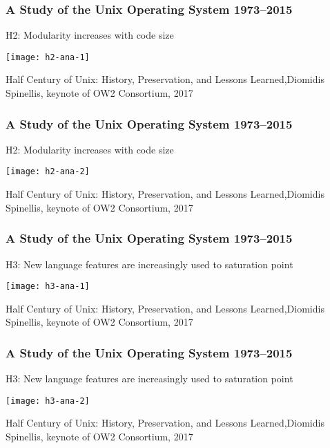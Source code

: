 \begin{frame}[plain]
	\frametitle{A Study of the Unix Operating System 1973–2015}
	\centering
	H2: Modularity increases with code
	size
	
	\texttt{[image: h2-ana-1]}
	
	\tiny Half Century of Unix:
	History, Preservation, and
	Lessons Learned,Diomidis Spinellis, keynote of OW2 Consortium, 2017
	
\end{frame}	



\begin{frame}[plain]
	\frametitle{A Study of the Unix Operating System 1973–2015}
	\centering
	H2: Modularity increases with code
	size
	
	\texttt{[image: h2-ana-2]}
	
	\tiny Half Century of Unix:
	History, Preservation, and
	Lessons Learned,Diomidis Spinellis, keynote of OW2 Consortium, 2017
	
\end{frame}	




\begin{frame}[plain]
	\frametitle{A Study of the Unix Operating System 1973–2015}
	\centering
	H3: New language features are
	increasingly used to saturation point
	
	
	\texttt{[image: h3-ana-1]}
	
	\tiny Half Century of Unix:
	History, Preservation, and
	Lessons Learned,Diomidis Spinellis, keynote of OW2 Consortium, 2017
	
\end{frame}	

\begin{frame}[plain]
	\frametitle{A Study of the Unix Operating System 1973–2015}
	\centering
	H3: New language features are
	increasingly used to saturation point
	
	
	\texttt{[image: h3-ana-2]}
	
	\tiny Half Century of Unix:
	History, Preservation, and
	Lessons Learned,Diomidis Spinellis, keynote of OW2 Consortium, 2017
	
\end{frame}	

